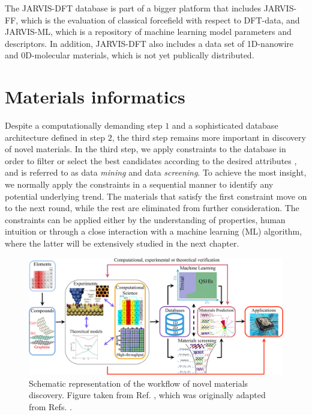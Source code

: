The JARVIS-DFT database is part of a bigger platform that includes JARVIS-FF, which is the evaluation of classical forcefield with respect to DFT-data, and JARVIS-ML, which is a repository of machine learning model parameters and descriptors.
In addition, JARVIS-DFT also includes a data set of 1D-nanowire and 0D-molecular materials, which is not yet publically distributed.

\section{Materials informatics}

Despite a computationally demanding step $1$ and a sophisticated database architecture defined in step $2$, the third step remains more important in discovery of novel materials. In the third step, we apply constraints to the database in order to filter or select the best candidates according to the desired attributes \cite{Schleder2019}, and is referred to as data \textit{mining} and data \textit{screening}. To achieve the most insight, we normally apply the constraints in a sequential manner to identify any potential underlying trend. The materials that satisfy the first constraint move on to the next round, while the rest are eliminated from further consideration. The constraints can be applied either by the understanding of properties, human intuition or through a close interaction with a machine learning (ML) algorithm, where the latter will be extensively studied in the next chapter.

\begin{figure}[ht!]
  \centering
  \includegraphics{theory/figures/ht-workflow.jpg}
  \caption{Schematic representation of the workflow of novel materials discovery.  Figure taken from Ref. \cite{Schleder2019}, which was originally adapted from Refs. \cite{Mounet2018, Acosta2018, Polini2013}.}
  \label{fig:ht-workflow}
\end{figure}

